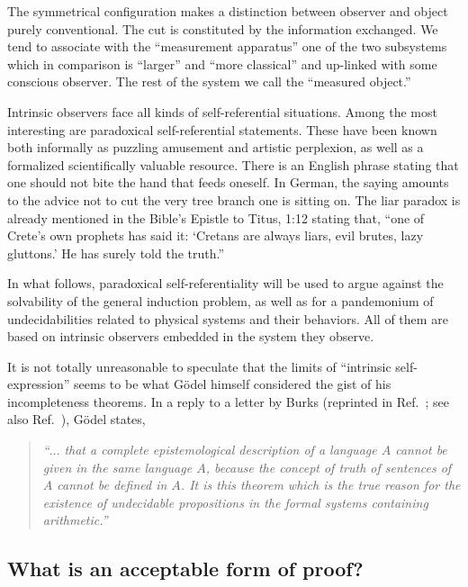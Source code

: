 \documentclass[rmp,amsfonts,showpacs,showkeys]{revtex4}
\begin{document}
The symmetrical configuration makes a distinction between observer and object purely conventional.
The cut is constituted by the information exchanged.
We tend to associate with the ``measurement apparatus''
one of the two subsystems which in comparison is ``larger'' and ``more classical''
and up-linked with some conscious observer.
The rest of the system we call the ``measured object.''






Intrinsic observers face all kinds of self-referential situations.
Among the most interesting are paradoxical self-referential statements.
These have been known
both informally as puzzling amusement and artistic perplexion,
as well as a formalized scientifically valuable resource.
There is an English phrase stating that one should not bite the hand that feeds oneself.
In German, the saying amounts to the advice not to cut the very tree branch one is sitting on.
The liar paradox is already mentioned in the Bible's Epistle to Titus, 1:12 stating that,
``one of Crete's own prophets has said it: `Cretans are always liars, evil brutes, lazy gluttons.'
He has surely told the truth.''

In what follows, paradoxical self-referentiality will be used to argue
against the solvability of the general induction problem,
as well as for a pandemonium of undecidabilities related to physical systems
and their behaviors. All of them are based on intrinsic observers embedded
in the system they observe.

It is not totally unreasonable to speculate that the
limits of ``intrinsic self-expression'' seems to be
what G\"odel himself
considered the gist of his incompleteness theorems.
In a reply to a letter by Burks
(reprinted in Ref.~\cite[p. 55]{v-neumann-66}; see also Ref.~\cite[p.554]{fef-84}),
G\"odel states,
 \begin{quote}
 {\em
 ``$\ldots$ that a complete epistemological description
 of a language $A$ cannot be given in the same language $A$, because
 the concept of truth of sentences of $A$ cannot be defined in $A$. It
 is this theorem which is the true reason for the existence of
 undecidable propositions in the formal systems containing arithmetic.''}
 \end{quote}







\subsection{What is an acceptable form of proof?}
\end{document}
